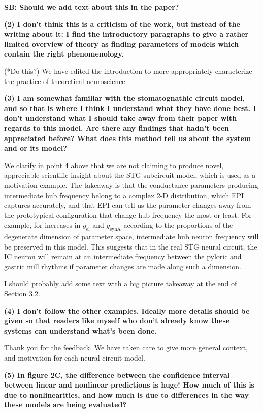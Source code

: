 \documentclass[11pt,a4paper]{article}
\begin{document}
\textbf{SB: Should we add text about this in the paper?}

\textbf{(2) I don't think this is a criticism of the work, but instead of the writing about it: I find the introductory paragraphs to give a rather limited overview of theory as finding parameters of models which contain the right phenomenology. }

(*Do this?) We have edited the introduction to more appropriately characterize the
practice of theoretical neuroscience.

\textbf{(3) I am somewhat familiar with the stomatognathic circuit model, and so that is where I think I understand what they have done best. I don't understand what I should take away from their paper with regards to this model. Are there any findings that hadn't been appreciated before? What does this method tell us about the system and or its model? }

We clarify in point 4 above that we are not claiming to produce novel, appreciable scientific insight about the STG subcircuit model, which is used as a motivation example. The takeaway is that the conductance parameters producing intermediate hub frequency belong to a complex 2-D distribution, which EPI captures accurately, and that EPI can tell us the parameter changes away from the prototypical configuration that change hub frequency the most or least.  For example, for increases in $g_{\text{el}}$ and $g_{\text{synA}}$ according to the proportions of the degenerate dimension of parameter space, intermediate hub neuron frequency will be preserved in this model.  This suggests that in the real STG neural circuit, the IC neuron will remain at an intermediate frequency between the pyloric and gastric mill rhythms if parameter changes are made along such 
a dimension.

I should probably add some text with a big picture takeaway at the end of Section 3.2.

\textbf{(4) I don't follow the other examples. Ideally more details should be given so that readers like myself who don't already know these systems can understand what's been done. }

Thank you for the feedback.  We have taken care to give more general context, and motivation for each neural circuit model.

\textbf{(5) In figure 2C, the difference between the confidence interval between linear and nonlinear predictions is huge! How much of this is due to nonlinearities, and how much is due to differences in the way these models are being evaluated? }
\end{document}
